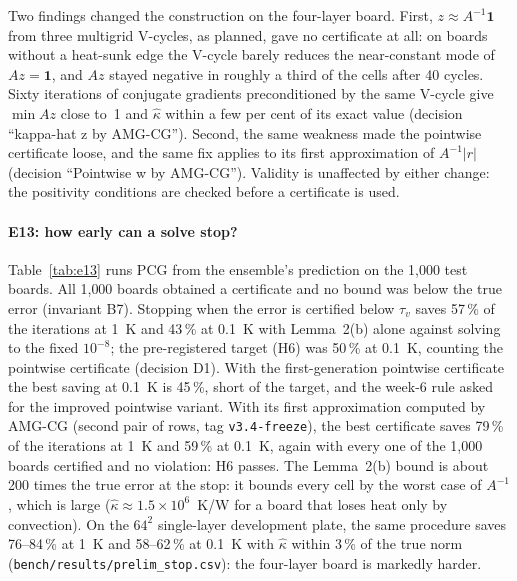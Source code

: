 Two findings changed the construction on the four-layer board. First, $z\approx A^{-1}\mathbf 1$
from three multigrid V-cycles, as planned, gave no certificate at all: on boards without a
heat-sunk edge the V-cycle barely reduces the near-constant mode of $Az=\mathbf 1$, and $Az$ stayed
negative in roughly a third of the cells after 40 cycles. Sixty iterations of conjugate gradients
preconditioned by the same V-cycle give $\min Az$ close to~1 and $\hat\kappa$ within a few per cent
of its exact value (decision ``kappa-hat z by AMG-CG''). Second, the same weakness made the
pointwise certificate loose, and the same fix applies to its first approximation of
$A^{-1}|r|$ (decision ``Pointwise w by AMG-CG''). Validity is unaffected by either change: the
positivity conditions are checked before a certificate is used.

\paragraph{E13: how early can a solve stop?} Table~\ref{tab:e13} runs PCG from the ensemble's
prediction on the 1{,}000 test boards. All 1{,}000 boards obtained a certificate and no bound was
below the true error (invariant B7). Stopping when the error is certified below $\tau_v$ saves
57\,\% of the iterations at 1~K and 43\,\% at 0.1~K with Lemma~2(b) alone
against solving to the fixed $10^{-8}$; the pre-registered target (H6) was 50\,\% at 0.1~K,
counting the pointwise certificate (decision D1). With the first-generation pointwise certificate
the best saving at 0.1~K is 45\,\%, short of the target, and the week-6 rule asked for the
improved pointwise variant. With its first approximation computed by AMG-CG (second pair of rows,
tag \texttt{v3.4-freeze}), the best certificate saves 79\,\% of the iterations at 1~K and
59\,\% at 0.1~K, %
again with every one of the 1{,}000 boards certified and no violation: H6 passes.
The Lemma~2(b) bound is about 200 times the true error at the stop: it bounds every cell by the
worst case of $A^{-1}$, which is large ($\hat\kappa\approx1.5\times10^6$~K/W for a board that
loses heat only by convection). On the $64^2$ single-layer development plate, the same procedure
saves 76--84\,\% at 1~K and 58--62\,\% at 0.1~K with $\hat\kappa$ within 3\,\% of the true norm
(\texttt{bench/results/prelim\_stop.csv}): the four-layer board is markedly harder.



